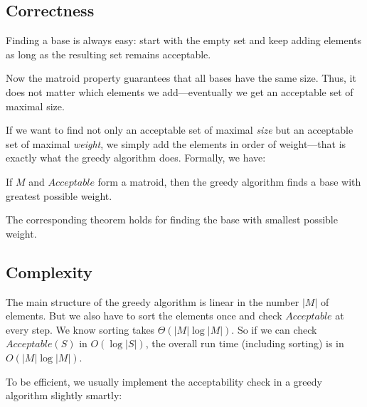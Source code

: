 \subsection{Correctness}

Finding a base is always easy: start with the empty set and keep adding elements as long as the resulting set remains acceptable.

Now the matroid property guarantees that all bases have the same size.
Thus, it does not matter which elements we add---eventually we get an acceptable set of maximal size.

If we want to find not only an acceptable set of maximal \emph{size} but an acceptable set of maximal \emph{weight}, we simply add the elements in order of weight---that is exactly what the greedy algorithm does.
Formally, we have:

\begin{theorem}
If $M$ and $Acceptable$ form a matroid, then the greedy algorithm finds a base with greatest possible weight.
\end{theorem}

The corresponding theorem holds for finding the base with smallest possible weight.

\subsection{Complexity}

The main structure of the greedy algorithm is linear in the number $|M|$ of elements.
But we also have to sort the elements once and check $Acceptable$ at every step.
We know sorting takes $\Theta(|M|\log |M|)$.
So if we can check $Acceptable(S)$ in $O(\log|S|)$, the overall run time (including sorting) is in $O(|M|\log|M|)$.

To be efficient, we usually implement the acceptability check in a greedy algorithm slightly smartly:
\begin{acode}
\\
\\
\\
\end{acode}

